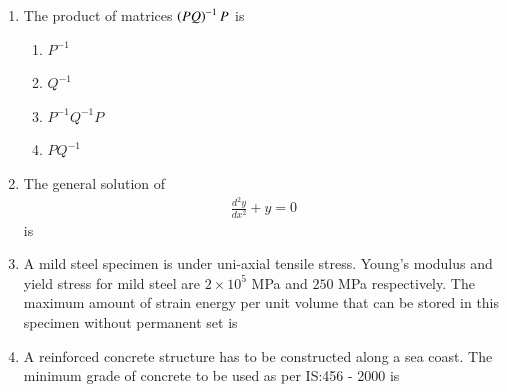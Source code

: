 \documentclass[journal]{IEEEtran}
\begin{document}
\begin{enumerate}
\item The product of matrices $\brak{PQ}^{-1} P$ is \hfill {}
\begin{enumerate}
\item $P^{-1}$
\item $Q^{-1}$
\item $P^{-1}Q^{-1}P$
\item $PQ^{-1}$
\end{enumerate}


\item The general solution of 
\begin{align} 
\frac{d^2y}{dx^2} + y = 0
\end{align}
is  \hfill {}
\begin{enumerate}
\end{enumerate}


\item A mild steel specimen is under uni-axial tensile stress. Young's modulus and yield stress for mild steel are $2 \times 10^5$ MPa and $250$ MPa respectively. The maximum amount of strain energy per unit volume that can be stored in this specimen without permanent set is \hfill {}

\begin{enumerate}
\end{enumerate}

\item A reinforced concrete structure has to be constructed along a sea coast. The minimum grade of concrete to be used as per IS:456 - 2000 is  \hfill {}
\begin{enumerate}
\end{enumerate}


\end{enumerate}
\end{document}
